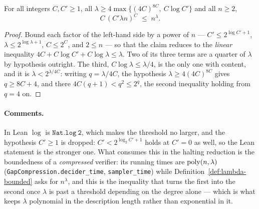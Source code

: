 \effortMedium

\begin{lemma}
\label{lem:lambda-bound}
\leanok
For all integers $C, C' \geq 1$, all $\lambda \geq 4 \max\{ (4C)^{8C},\ C \log C' \}$
and all $n \geq 2$,
\begin{equation*}
  C\, (C' \lambda n)^{C} \;\leq\; n^{\lambda} .
\end{equation*}
\end{lemma}

\begin{proof}
\leanok
Bound each factor of the left-hand side by a power of $n$ --- $C' \leq 2^{\log C' + 1}$,
$\lambda \leq 2^{\log \lambda + 1}$, $C \leq 2^{C}$, and $2 \leq n$ --- so that the claim
reduces to the \emph{linear} inequality
$4C + C \log C' + C \log \lambda \leq \lambda$. Two of its three terms are a quarter of
$\lambda$ by hypothesis outright. The third, $C \log \lambda \leq \lambda/4$, is the only
one with content, and it is $\lambda < 2^{\lambda / 4C}$: writing $q = \lambda / 4C$, the
hypothesis $\lambda \geq 4(4C)^{8C}$ gives $q \geq 8C + 4$, and there
$4C(q+1) < q^2 \leq 2^q$, the second inequality holding from $q = 4$ on.
\end{proof}

\paragraph{Comments.} In Lean $\log$ is $\mathtt{Nat.log\ 2}$, which makes the threshold no
larger, and the hypothesis $C' \geq 1$ is dropped: $C' < 2^{\log_2 C' + 1}$ holds at $C' = 0$
as well, so the Lean statement is the stronger one. What consumes this in the halting
reduction is the boundedness of a \emph{compressed} verifier: its running times are
$\mathrm{poly}(n, \lambda)$ (\texttt{GapCompression.decider\_time}, \texttt{sampler\_time}) while
Definition~\ref{def:lambda-bounded} asks for $n^\lambda$, and this is the inequality that
turns the first into the second once $\lambda$ is past a threshold depending on the degree
alone --- which is what keeps $\lambda$ polynomial in the description length rather than
exponential in it.

\effortEasy

